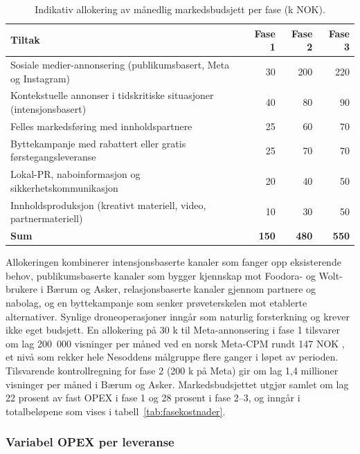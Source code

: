 \begin{table}[h]
\centering
\caption[]{Indikativ allokering av månedlig markedsbudsjett per fase (k
NOK).}
\label{tab:mediabudsjett}
\small
\renewcommand{\arraystretch}{1.15}
\begin{tabularx}{\textwidth}{@{} >{\raggedright\arraybackslash}X r r r @{}}
\toprule
\rowcolor{tableheader}
\color{white}\textbf{Tiltak} &
\color{white}\textbf{Fase 1} &
\color{white}\textbf{Fase 2} &
\color{white}\textbf{Fase 3} \\
\midrule
Sosiale medier-annonsering (publikumsbasert, Meta og Instagram) & 30 & 200 & 220 \\
\rowcolor{tablerow}
Kontekstuelle annonser i tidskritiske situasjoner (intensjonsbasert) & 40 & 80 & 90 \\
Felles markedsføring med innholdspartnere & 25 & 60 & 70 \\
\rowcolor{tablerow}
Byttekampanje med rabattert eller gratis førstegangsleveranse & 25 & 70 & 70 \\
Lokal-PR, naboinformasjon og sikkerhetskommunikasjon & 20 & 40 & 50 \\
\rowcolor{tablerow}
Innholdsproduksjon (kreativt materiell, video, partnermateriell) & 10 & 30 & 50 \\
\midrule
\textbf{Sum} & \textbf{150} & \textbf{480} & \textbf{550} \\
\bottomrule
\end{tabularx}
\end{table}

Allokeringen kombinerer intensjonsbaserte kanaler som fanger opp
eksisterende behov, publikumsbaserte kanaler som bygger kjennskap mot
Foodora- og Wolt-brukere i Bærum og Asker, relasjonsbaserte kanaler
gjennom partnere og nabolag, og en byttekampanje som senker
prøveterskelen mot etablerte alternativer. Synlige droneoperasjoner
inngår som naturlig forsterkning og krever ikke eget budsjett. En
allokering på 30 k til Meta-annonsering i fase 1 tilsvarer om lag
200~000 visninger per måned ved en norsk Meta-CPM rundt 147 NOK
\parencite{superads2026}, et nivå som rekker hele Nesoddens målgruppe
flere ganger i løpet av perioden. Tilsvarende kontrollregning for fase 2
(200 k på Meta) gir om lag 1{,}4 millioner visninger per måned i Bærum
og Asker. Markedsbudsjettet utgjør samlet om lag 22 prosent av fast
OPEX i fase 1 og 28 prosent i fase 2--3, og inngår i totalbeløpene som
vises i tabell~\ref{tab:fasekostnader}.

\subsubsection{Variabel OPEX per leveranse}
\label{app:variabelopex}

